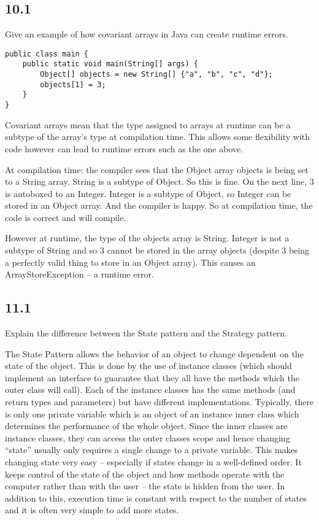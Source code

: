 \documentclass[10pt,\jkfside,a4paper]{article}
\begin{document}
\subsection*{10.1} Give an example of how covariant arrays in Java can create runtime errors.

\begin{lstlisting}
public class main {
    public static void main(String[] args) {
        Object[] objects = new String[] {"a", "b", "c", "d"};
        objects[1] = 3;
    }
}
\end{lstlisting}

Covariant arrays mean that the type assigned to arrays at runtime can be a subtype of the array's 
type at compilation time. This allows some flexibility with code however can lead to runtime errors 
such as the one above.

At compilation time: the compiler sees that the Object array objects is being set to a String array. 
String is a subtype of Object. So this is fine. On the next line, 3 is autoboxed to an Integer. Integer 
is a subtype of Object, so Integer can be stored in an Object array. And the compiler is happy.
So at compilation time, the code is correct and will compile.

However at runtime, the type of the objects array is String. Integer is not a subtype of String and so 
3 cannot be stored in the array objects (despite 3 being a perfectly valid thing to store in an Object 
array). This causes an ArrayStoreException -- a runtime error.

\subsection*{11.1} Explain the difference between the State pattern and the Strategy pattern.

The State Pattern allows the behavior of an object to change dependent on the state of the object. 
This is done by the use of instance classes (which should implement an interface to guarantee 
that they all have the methods which the outer class will call). Each of the instance classes has 
the same methods (and return types and parameters) but have different implementations. Typically, there 
is only one private variable which is an object of an instance inner class which determines the performance 
of the whole object. Since the inner classes are instance classes, they can access the outer classes 
scope and hence changing ``state'' usually only requires a single change to a private variable. This makes 
changing state very easy -- especially if states change in a well-defined order. It keeps control of the 
state of the object and how methods operate with the computer rather than with the user -- the state is 
hidden from the user. In addition to this, execution time is constant with respect to the number of states 
and it is often very simple to add more states.
\end{document}
